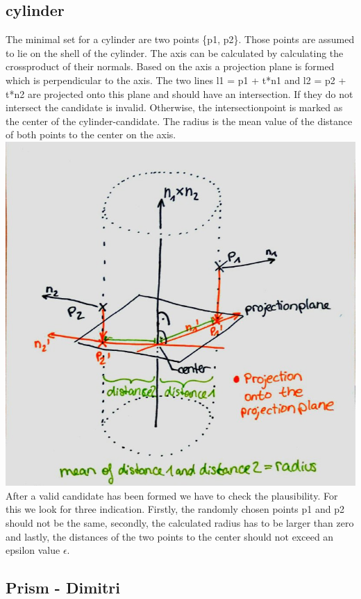 \documentclass[../ClassicThesis.tex]{subfiles}
\begin{document}
\subsection{cylinder}
The minimal set for a cylinder are two points \{p1, p2\}. Those points are assumed to lie on the shell of the cylinder. The axis can be calculated by calculating the crossproduct of their normals. Based on the axis a projection plane is formed which is perpendicular to the axis. The two lines l1 = p1 + t*n1 and l2 = p2 + t*n2 are projected onto this plane and should have an intersection. If they do not intersect the candidate is invalid. Otherwise, the intersectionpoint is marked as the center of the cylinder-candidate. The radius is the mean value of the distance of both points to the center on the axis.\\
\includegraphics[width=\columnwidth]{Images/10-classifiers-cylinderClassification.jpg}
After a valid candidate has been formed we have to check the plausibility. For this we look for three indication. Firstly, the randomly chosen points p1 and p2 should not be the same, secondly, the calculated radius has to be larger than zero and lastly, the distances of the two points to the center should not exceed an epsilon value $\epsilon$.
\subsection{Prism - Dimitri}
\end{document}
